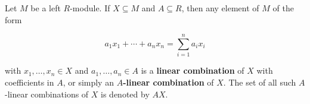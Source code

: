 Let $M$ be a left $R$-module. If $X \subseteq M$ and $A \subseteq R$, then any element of $M$ of the form

$$a_1 x_1 + \cdots + a_n x_n = \sum_{i=1}^{n} a_i x_i$$

with $x_1, \ldots, x_n \in X$ and $a_1, \ldots, a_n \in A$ is a \textbf{linear combination} of $X$ with coefficients in $A$, or simply an \textbf{$A$-linear combination} of $X$. The set of all such $A$-linear combinations of $X$ is denoted by $AX$.
